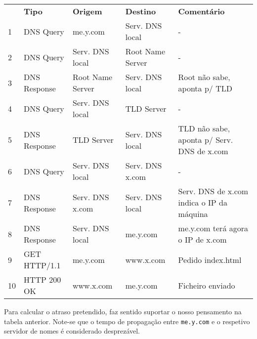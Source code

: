 \begin{enumerate}[leftmargin=\labelsep]
        \begin{table}[H]
          \centering
          \begin{tabular}{l|l|l|l|l}
               & \textbf{Tipo} & \textbf{Origem}  & \textbf{Destino} & \textbf{Comentário}                        \\
            1  & DNS Query     & me.y.com         & Serv. DNS local  & -                                          \\
            2  & DNS Query     & Serv. DNS local  & Root Name Server & -                                          \\
            3  & DNS Response  & Root Name Server & Serv. DNS local  & Root não sabe, aponta p/ TLD               \\
            4  & DNS Query     & Serv. DNS local  & TLD Server       & -                                          \\
            5  & DNS Response  & TLD Server       & Serv. DNS local  & TLD não sabe, aponta p/ Serv. DNS de x.com \\
            6  & DNS Query     & Serv. DNS local  & Serv. DNS x.com  & -                                          \\
            7  & DNS Response  & Serv. DNS x.com  & Serv. DNS local  & Serv. DNS de x.com indica o IP da máquina  \\
            8  & DNS Response  & Serv. DNS local  & me.y.com         & me.y.com terá agora o IP de x.com          \\
            9  & GET HTTP/1.1  & me.y.com         & www.x.com        & Pedido index.html                          \\
            10 & HTTP 200 OK   & www.x.com        & me.y.com         & Ficheiro enviado
          \end{tabular}
        \end{table}


        Para calcular o atraso pretendido, faz sentido suportar o nosso pensamento na tabela
        anterior. Note-se que o tempo de propagação entre \texttt{me.y.com} e o
        respetivo servidor de nomes é considerado desprezável.


\end{enumerate}
